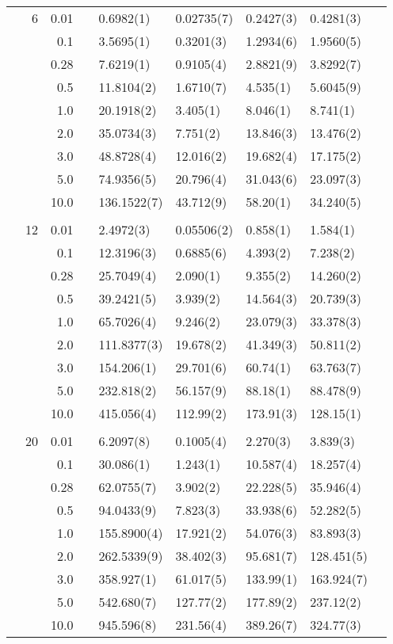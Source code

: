 \begin{table}[H]
\begin{tabularx}{\textwidth}{R{1cm}rrcR{2.3cm}R{2.3cm}R{2.3cm}R{2.3cm}R{1cm}}
		&6 & 0.01 && 0.6982(1) & 0.02735(7) & 0.2427(3) & 0.4281(3) \\
		&& 0.1 && 3.5695(1) & 0.3201(3) & 1.2934(6) & 1.9560(5) \\
		&& 0.28 && 7.6219(1) & 0.9105(4) & 2.8821(9) & 3.8292(7) \\
		&& 0.5 && 11.8104(2) & 1.6710(7) & 4.535(1) & 5.6045(9) \\
		&& 1.0 && 20.1918(2) & 3.405(1) & 8.046(1) & 8.741(1) \\
		&& 2.0 && 35.0734(3) & 7.751(2) & 13.846(3) & 13.476(2) \\
		&& 3.0 && 48.8728(4) & 12.016(2) & 19.682(4) & 17.175(2) \\ 
		&& 5.0 && 74.9356(5) & 20.796(4) & 31.043(6) & 23.097(3) \\
		&& 10.0 && 136.1522(7) & 43.712(9) & 58.20(1) & 34.240(5) \\
		\hdashline \\
		
		&12 & 0.01 && 2.4972(3) & 0.05506(2) & 0.858(1) & 1.584(1)\\
		&& 0.1 && 12.3196(3) & 0.6885(6) & 4.393(2) & 7.238(2) \\
		&& 0.28 && 25.7049(4) & 2.090(1) & 9.355(2) & 14.260(2) \\
		&& 0.5 && 39.2421(5) & 3.939(2) & 14.564(3) & 20.739(3) \\
		&& 1.0 && 65.7026(4) & 9.246(2) & 23.079(3) & 33.378(3) \\
		&& 2.0 && 111.8377(3) & 19.678(2) & 41.349(3) & 50.811(2) \\
		&& 3.0 && 154.206(1) & 29.701(6) & 60.74(1) & 63.763(7) \\ 
		&& 5.0 && 232.818(2) & 56.157(9) & 88.18(1) & 88.478(9) \\
		&& 10.0 && 415.056(4) & 112.99(2) & 173.91(3) & 128.15(1) \\
		\hdashline \\
		
		&20 & 0.01 && 6.2097(8) & 0.1005(4) & 2.270(3) & 3.839(3) \\
		&& 0.1 && 30.086(1) & 1.243(1) & 10.587(4) & 18.257(4) \\
		&& 0.28 && 62.0755(7) & 3.902(2) & 22.228(5) & 35.946(4) \\
		&& 0.5 && 94.0433(9) & 7.823(3) & 33.938(6) & 52.282(5) \\
		&& 1.0 && 155.8900(4) & 17.921(2) & 54.076(3) & 83.893(3) \\
		&& 2.0 && 262.5339(9) & 38.402(3) & 95.681(7) & 128.451(5) \\
		&& 3.0 && 358.927(1) & 61.017(5) & 133.99(1) & 163.924(7) \\ 
		&& 5.0 && 542.680(7) & 127.77(2) & 177.89(2) & 237.12(2) \\
		&& 10.0 && 945.596(8) & 231.56(4) & 389.26(7) & 324.77(3) \\
		\hline \hline
	\end{tabularx}
\end{table} 

